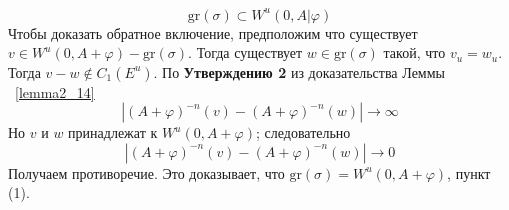 \begin{demo}
$$
\mathrm{gr}(\sigma) \subset W^u(0, A|\varphi)
$$
Чтобы доказать обратное включение, предположим что существует $v \in W^u(0,A+\varphi) - \mathrm{gr}(\sigma)$. Тогда существует $w \in \mathrm{gr}(\sigma)$ такой, что $v_u=w_u$. Тогда $v-w \notin C_1(E^u)$. По  \textbf{Утверждению 2} из доказательства Леммы ~\ref{lemma2_14}
$$
|(A+\varphi)^{-n}(v)-(A+\varphi)^{-n}(w)| \rightarrow \infty
$$
Но $v$ и $w$ принадлежат к $W^u(0,A+\varphi)$; следовательно
$$
|(A+\varphi)^{-n}(v)-(A+\varphi)^{-n}(w)| \rightarrow 0
$$
Получаем противоречие. Это доказывает, что $\mathrm{gr}(\sigma)=W^u(0,A+\varphi)$, пункт (1).



\end{demo}
 


